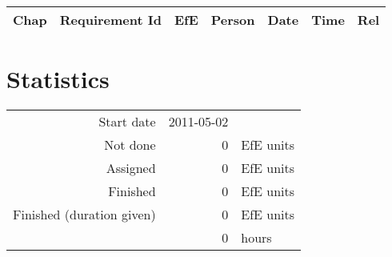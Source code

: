 {\small \begin{longtable}{|c|p{5.5cm}||r|l|l|r|r|} \hline
\textbf{Chap} & \textbf{Requirement Id} & \textbf{EfE} & \textbf{Person} & \textbf{Date} & \textbf{Time} & \textbf{Rel} \\ \hline\endhead
\end{longtable}}\section{Statistics}
\begin{longtable}{rrl}
Start date & 2011-05-02 & \\ 
Not done & 0 & EfE units \\ 
Assigned & 0 & EfE units \\ 
Finished & 0 & EfE units \\ 
Finished (duration given) & 0 & EfE units \\ 
 & 0 & hours \\ 
\end{longtable}